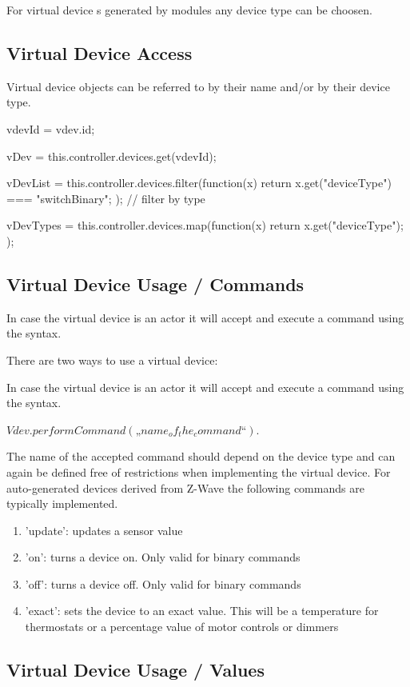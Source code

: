 For virtual device s generated by modules any device type can be choosen.
 
\subsection{Virtual Device Access}


Virtual device objects can be referred to by their name and/or by their device type. 

vdevId = vdev.id;

vDev = this.controller.devices.get(vdevId);

vDevList = this.controller.devices.filter(function(x) { 
return x.get("deviceType") === "switchBinary"; }); // filter by type

vDevTypes = this.controller.devices.map(function(x) { return x.get("deviceType"); }); 


\subsection{Virtual Device Usage / Commands}

In case the virtual device is an actor it will accept and execute a command using the syntax.


There are two ways to use a virtual device:

In case the virtual device is an actor it will accept and execute a command using the syntax.

$Vdev.performCommand(„name_of_the_command“)$.

The name of the accepted command should depend on the device type and can again be defined 
free of restrictions when implementing the virtual device. For auto-generated devices 
derived from Z-Wave the following commands are typically implemented.

\begin{enumerate}
\item 'update': updates a sensor value
\item 'on': turns a device on.  Only valid for binary commands
\item 'off': turns a device off. Only valid for binary commands
\item 'exact': sets the device to an exact value. This will be a temperature for 
thermostats or a percentage value of motor controls or dimmers
\end{enumerate}

\subsection{Virtual Device Usage / Values}

